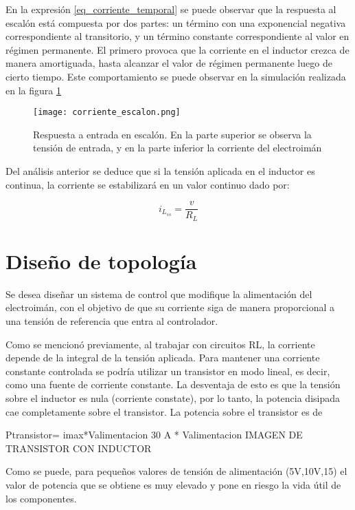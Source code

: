 En la expresión \ref{eq_corriente_temporal} se puede observar que la respuesta al escalón está compuesta por dos partes: un término con una exponencial negativa correspondiente al transitorio, y un término constante correspondiente al valor en régimen permanente. El primero provoca que la corriente en el inductor crezca de manera amortiguada, hasta alcanzar el valor de régimen permanente luego de cierto tiempo. Este comportamiento se puede observar en la simulación realizada en la figura \ref{fig:img_respuesta_escalon}

\begin{figure}[H]
	\centering
	\texttt{[image: corriente\_escalon.png]}
	\caption{Respuesta a entrada en escalón. En la parte superior se observa la tensión de entrada, y en la parte inferior la corriente del electroimán}
	\label{fig:img_respuesta_escalon}
\end{figure}


Del análisis anterior se deduce que si la tensión aplicada en el inductor es continua, la corriente se estabilizará en un valor continuo dado por:

\begin{equation} \label{eq_corriente_ss}
	i_{L_{ss}}=\frac{v}{R_L}
\end{equation}

\section{Diseño de topología}

Se desea diseñar un sistema de control que modifique la alimentación del electroimán, con el objetivo de que su corriente siga de manera proporcional a una tensión de referencia que entra al controlador.

Como se mencionó previamente, al trabajar con circuitos RL, la corriente depende de la integral de la tensión aplicada. Para mantener una corriente constante controlada se podría utilizar un transistor en modo lineal, es decir, como una fuente de corriente constante. La desventaja de esto es que la tensión sobre el inductor es nula (corriente constate), por lo tanto, la potencia disipada cae completamente sobre el transistor. La potencia sobre el transistor es de 

Ptransistor= imax*Valimentacion 30 A * Valimentacion
IMAGEN DE TRANSISTOR CON INDUCTOR

Como se puede, para pequeños valores de tensión de alimentación (5V,10V,15) el valor de potencia que se obtiene es muy elevado y pone en riesgo la vida útil de los componentes.

